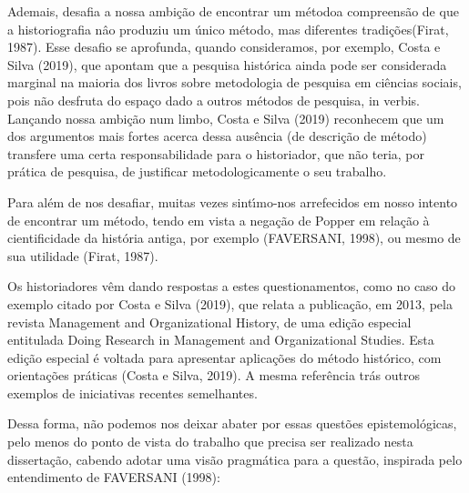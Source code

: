 \documentclass[
12pt,		%
openright,	%
twoside,  %
a4paper,			%
chapter=TITLE,		%
english,			%
french,				%
spanish,			%
brazil				%
]{USPSC-classe/USPSC}
\begin{document}
Ademais, desafia a nossa ambi\c{c}\~ao de \textquotedbl encontrar um m\'etodo\textquotedbl  a compreens\~ao de que a \textquotedbl historiografia n\^ao produziu um \'unico m\'etodo, mas diferentes tradi\c{c}\~oes\textquotedbl   (Firat, 1987).  Esse desafio se aprofunda, quando consideramos, por exemplo, Costa e Silva (2019), que apontam que a \textquotedbl pesquisa hist\'orica ainda pode ser considerada marginal na maioria dos livros sobre metodologia de pesquisa em ci\^encias sociais, pois n\~ao desfruta do espa\c{c}o dado a outros m\'etodos de pesquisa\textquotedbl , in verbis. Lan\c{c}ando nossa ambi\c{c}\~ao num limbo,  Costa e Silva (2019) reconhecem \textquotedbl que um dos argumentos mais fortes acerca dessa aus\^encia (de descri\c{c}\~ao de m\'etodo) transfere uma certa responsabilidade para o historiador, que n\~ao teria, por pr\'atica de pesquisa, de justificar metodologicamente o seu trabalho\textquotedbl .









Para al\'em de nos desafiar, muitas vezes sint\'{\i}mo-nos arrefecidos em nosso intento de \textquotedbl encontrar um m\'etodo\textquotedbl , tendo em vista a nega\c{c}\~ao de Popper em rela\c{c}\~ao \`a cientificidade da hist\'oria antiga, por exemplo (FAVERSANI, 1998), ou mesmo de sua utilidade (Firat, 1987).









Os historiadores v\^em dando respostas a estes questionamentos, como no caso do exemplo citado por  Costa e Silva (2019), que relata a publica\c{c}\~ao, em 2013, pela revista \textquotedbl Management and Organizational History\textquotedbl , de uma edi\c{c}\~ao especial entitulada \textquotedbl Doing Research in Management and Organizational Studies\textquotedbl . Esta edi\c{c}\~ao especial \'e voltada para apresentar aplica\c{c}\~oes do m\'etodo hist\'orico, com orienta\c{c}\~oes pr\'aticas  (Costa e Silva, 2019). A mesma refer\^encia tr\'as outros exemplos de iniciativas recentes semelhantes.









Dessa forma, n\~ao podemos nos deixar abater por essas quest\~oes epistemol\'ogicas, pelo menos do ponto de vista do trabalho que precisa ser realizado nesta disserta\c{c}\~ao, cabendo adotar uma vis\~ao pragm\'atica para a quest\~ao, inspirada pelo entendimento de FAVERSANI (1998):
\end{document}
